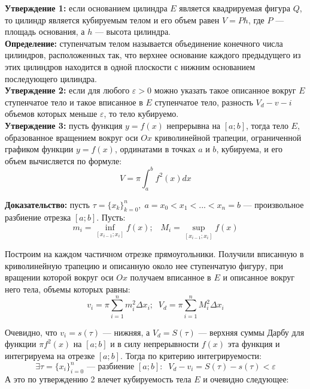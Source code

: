 \documentclass{article}
\begin{document}
  \textbf{Утверждение 1:} если основанием цилиндра $E$ является квадрируемая фигура $Q$, то цилиндр является кубируемым телом и его объем равен $V=Ph$, где $P$ --- площадь основания, а $h$ --- высота цилиндра.\\
  
  \textbf{Определение:} ступенчатым телом называется объединение конечного числа цилиндров, расположенных так, что верхнее основание каждого предыдущего из этих цилиндров находится в одной плоскости с нижним основанием последующего цилиндра.\\
  
  \textbf{Утверждение 2:} если для любого $\varepsilon>0$ можно указать такое описанное вокруг $E$ ступенчатое тело и такое вписанное в $E$ ступенчатое тело, разность $V_d-v-i$ объемов которых меньше $\varepsilon$, то тело кубируемо.\\
  
  \textbf{Утверждение 3:} пусть функция $y=f(x)$ непрерывна на $[a;b]$, тогда тело $E$, образованное вращением вокруг оси $Ox$ криволинейной трапеции, ограниченной графиком функции $y=f(x)$, ординатами в точках $a$ и $b$, кубируема, и его объем вычисляется по формуле:
  \begin{equation}
    V=\pi\int_a^b f^2(x)dx
  \end{equation}
  
  \textbf{Доказательство:} пусть $\tau=\{x_k\}_{k=0}^n,\;a=x_0<x_1<...<x_n=b$ --- произвольное разбиение отрезка $[a;b]$. Пусть:
  \begin{equation}
    m_i=\inf_{[x_{i-1};x_i]} f(x);\;\;\;M_i=\sup_{[x_{i-1};x_i]} f(x)
  \end{equation}
  
  Построим на каждом частичном отрезке прямоугольники. Получили вписанную в криволинейную трапецию и описанную около нее ступенчатую фигуру, при вращении которой вокруг оси $Ox$ получаем вписанное в $E$ и описанное вокруг него тела, объемы которых равны:
  \begin{equation}
    v_i=\pi\sum_{i=1}^n m_i^2\Delta x_i;\;\;V_d=\pi\sum_{i=1}^n M_i^2\Delta x_i
  \end{equation}
  
  Очевидно, что $v_i=s(\tau)$ --- нижняя, а $V_d=S(\tau)$ --- верхняя суммы Дарбу для функции $\pi f^2(x)$ на $[a;b]$ и в силу непрерывности $f(x)$ эта функция и интегрируема на отрезке $[a;b]$. Тогда по критерию интегрируемости:
  \begin{equation}
    \exists\tau=\{x_i\}_{i=0}^n \text{ --- разбиение }[a;b]:\;\; V_d-v_i=S(\tau)-s(\tau)<\varepsilon
  \end{equation}
  А это по утверждению 2 влечет кубируемость тела $E$ и очевидно следующее:
  
\end{document}
